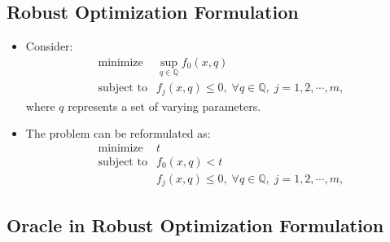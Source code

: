 \documentclass[]{article}
\begin{document}
\hypertarget{robust-optimization-formulation}{%
\subsection{Robust Optimization
Formulation}\label{robust-optimization-formulation}}

\begin{itemize}
\item
  Consider: \[\begin{array}{ll}
      \text{minimize}   & \sup_{q \in \mathbb Q} f_0(x,q) \\
      \text{subject to} & f_j(x,q) \leq 0, \;
       \forall q \in {\mathbb Q}, \; j = 1,2,\cdots,m,
    \end{array}\] where \(q\) represents a set of varying parameters.
\item
  The problem can be reformulated as: \[\begin{array}{ll}
      \text{minimize}   & t \\
      \text{subject to} & f_0(x,q) < t  \\
      & f_j(x,q) \leq 0, \;
       \forall q \in {\mathbb Q}, \; j = 1,2,\cdots,m,
    \end{array}\]
\end{itemize}

\hypertarget{oracle-in-robust-optimization-formulation}{%
\subsection{Oracle in Robust Optimization
Formulation}\label{oracle-in-robust-optimization-formulation}}
\end{document}
